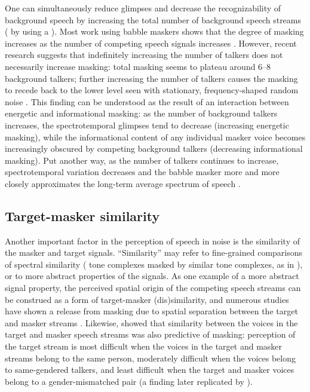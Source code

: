 One can simultaneously reduce glimpses and decrease the recognizability of background speech by increasing the total number of background speech streams (\ie{} by using a ).  Most work using babble maskers shows that the degree of masking increases as the number of competing speech signals increases \citep[\eg][]{Miller1947, BrungartEtAl2001}.  However, recent research suggests that indefinitely increasing the number of talkers does not necessarily increase masking: total masking seems to plateau around 6–8 background talkers; further increasing the number of talkers causes the masking to recede back to the lower level seen with stationary, frequency-shaped random noise \citep{SimpsonCooke2005}.  This finding can be understood as the result of an interaction between energetic and informational masking: as the number of background talkers increases, the spectrotemporal glimpses tend to decrease (increasing energetic masking), while the informational content of any individual masker voice becomes increasingly obscured by competing background talkers (decreasing informational masking).  Put another way, as the number of talkers continues to increase, spectrotemporal variation decreases and the babble masker more and more closely approximates the long-term average spectrum of speech \citep{SimpsonCooke2005}.

\subsection{Target-masker similarity\label{sec:similarity}}
Another important factor in the perception of speech in noise is the similarity of the masker and target signals.  “Similarity” may refer to fine-grained comparisons of spectral similarity (\eg{} tone complexes masked by similar tone complexes, as in \citealt{LeeRichards2011}), or to more abstract properties of the signals.\footnotemark{}  As one example of a more abstract signal property, the perceived spatial origin of the competing speech streams can be construed as a form of target-masker (dis)similarity, and numerous studies have shown a release from masking due to spatial separation between the target and masker streams \citep[\eg][]{FreymanEtAl1999, BrungartSimpson2002, FreymanEtAl2004, GallunEtAl2005, KiddEtAl2005a, JohnstoneLitovsky2006}.  Likewise, \citet{Brungart2001} showed that similarity between the voices in the target and masker speech streams was also predictive of masking: perception of the target stream is most difficult when the voices in the target and masker streams belong to the same person, moderately difficult when the voices belong to same-gendered talkers, and least difficult when the target and masker voices belong to a gender-mismatched pair (a finding later replicated by \citealt{HelferFreyman2008}).


